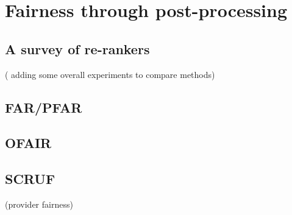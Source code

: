 \chapter{Fairness through post-processing}

\section{A survey of re-rankers} ( adding some overall experiments to compare methods)
\section{FAR/PFAR}
\section{OFAIR}
\section{SCRUF}
    (provider fairness)